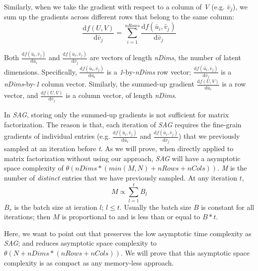 Similarly, when we take the gradient with respect to a column of \emph{V} (e.g. $\bar{v}_{j}$), we sum up the gradients across different rows that belong to the same column: 
\begin{equation} \label{eq:gradV}
\frac{\text{d}f(U,V)}{\text{d}\bar{v}_j} = \sum_{i=1}^{nRows} \frac{\text{d}f(\bar{u}_i,\bar{v}_j)}{\text{d}\bar{v}_j}
\end{equation}

Both $\frac{\text{d}f(\bar{u}_i,\bar{v}_j)}{\text{d}\bar{u}_i}$ and $\frac{\text{d}f(\bar{u}_i,\bar{v}_j)}{\text{d}\bar{v}_j}$ are vectors of length \emph{nDims}, the number of latent dimensions.
Specifically, $\frac{\text{d}f(\bar{u}_i,\bar{v}_j)}{\text{d}\bar{u}_i}$ is a \emph{1}-by-\emph{nDims} row vector;
$\frac{\text{d}f(\bar{u}_i,\bar{v}_j)}{\text{d}\bar{v}_j}$ is a \emph{nDims}-by-\emph{1} column vector.
Similarly, the summed-up gradient $\frac{\text{d}f(U,V)}{\text{d}\bar{u}_i}$ is a row vector, and $\frac{\text{d}f(U,V)}{\text{d}\bar{v}_j}$ is a column vector, of length \emph{nDims}.

In \emph{SAG}, storing only the summed-up gradients is not sufficient for matrix factorization.
The reason is that, each iteration of \emph{SAG} requires the fine-grain gradients of individual entries 
(e.g. $\frac{\text{d}f(\bar{u}_i,\bar{v}_j)}{\text{d}\bar{u}_i}$ and $\frac{\text{d}f(\bar{u}_i,\bar{v}_j)}{\text{d}\bar{v}_j}$) 
that we previously sampled at an iteration before \emph{t}.  
As we will prove, when directly applied to matrix factorization without using our \tool approach, \emph{SAG} will have a asymptotic space complexity of $\theta(nDims*(min(M,N)+nRows+nCols))$.
\emph{M} is the number of \emph{distinct} entries that we have previously sampled.  At any iteration $t$, 
\begin{equation} \label{eq:msampled}
M \propto \sum_{l=1}^{t} B_l
\end{equation}
$B_r$ is the batch size at ieration $l$; $l \leq t$.
Usually the batch size $B$ is constant for all iterations; then $M$ is proportional to and is less than or equal to $B*t$.

Here, we want to point out that \tool preserves the low asymptotic time complexity as \emph{SAG}; and \tool reduces asymptotic space complexity to $\theta(N+nDims*(nRows+nCols))$. 
We will prove that this asymptotic space complexity is as compact as any memory-less approach.


